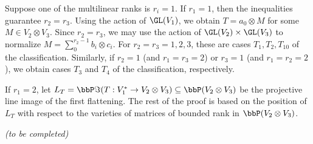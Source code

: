 Suppose one of the multilinear ranks is $r_i = 1$. If $r_1 = 1$, then the inequalities guarantee $r_2 = r_3$. Using the action of $\GL(V_1)$, we obtain $T = a_0 \otimes M$ for some $M \in V_2 \otimes V_3$. Since $r_2 = r_3$, we may use the action of $\GL(V_2) \times \GL(V_3)$ to normalize $M = \sum_{0}^{r_2-1} b_i \otimes c_i$. For $r_2 = r_3 = 1,2,3$, these are cases $T_1,T_2,T_{10}$ of the classification.  Similarly, if $r_2 = 1$ (and $r_1 = r_3 = 2$) or $r_3  = 1$ (and $r_1 = r_2 = 2$), we obtain cases $T_3$ and $T_4$ of the classification, respectively.

If $r_1 = 2$, let $L_T = \bbP \Im( T: V_1^* \to V_2 \otimes V_3) \subseteq \bbP (V_2 \otimes V_3)$ be the projective line image of the first flattening. The rest of the proof is based on the position of $L_T$ with respect to the varieties of matrices of bounded rank in $\bbP (V_2 \otimes V_3)$.

{\it (to be completed)}